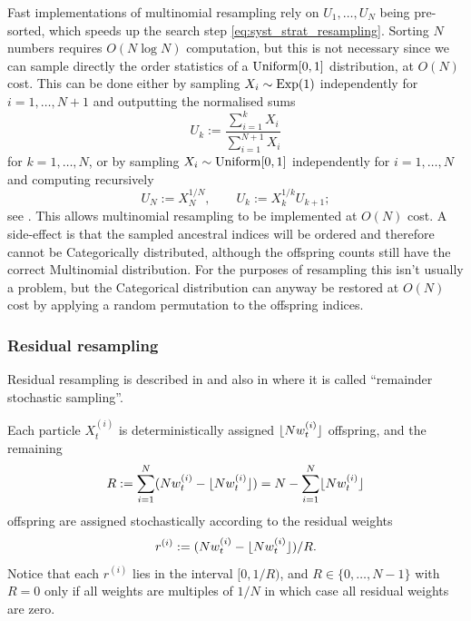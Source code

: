 Fast implementations of multinomial resampling rely on $U_1,\dots,U_N$ being pre-sorted, which speeds up the search step \eqref{eq:syst_strat_resampling}. Sorting $N$ numbers requires $O(N\log N)$ computation, but this is not necessary since we can sample directly the order statistics of a $\operatorname{Uniform}[0,1]$ distribution, at $O(N)$ cost.
This can be done either by 
sampling $X_i \sim \operatorname{Exp}(1)$ independently for $i=1,\dots,N+1$ and outputting the normalised sums
\begin{equation*}
U_k := \frac{\sum_{i=1}^k X_i}{\sum_{i=1}^{N+1} X_i}
\end{equation*}
for $k=1,\dots,N$,
or by sampling $X_i \sim \operatorname{Uniform}[0,1]$ independently for $i=1,\dots,N$ and computing recursively
\begin{equation*}
U_N := X_N^{1/N} , \qquad U_k := X_k^{1/k} U_{k+1} ;
\end{equation*}
see \textcite[Chapter 5, Section 3.1]{devroye1986}.
This allows multinomial resampling to be implemented at $O(N)$ cost. 
A side-effect is that the sampled ancestral indices will be ordered and therefore cannot be Categorically distributed, although the offspring counts still have the correct Multinomial distribution. For the purposes of resampling this isn't usually a problem, but the Categorical distribution can anyway be restored at $O(N)$ cost by applying a random permutation to the offspring indices.




\subsubsection{Residual resampling}
Residual resampling is described in \textcite{liu1998} and also in \textcite{whitley1994} where it is called ``remainder stochastic sampling''.

Each particle $X_{t}^{(i)}$ is deterministically assigned $\lfloor N w_t^{(i)} \rfloor$ offspring, and the remaining
\begin{equation*}
R := \sum_{i=1}^N ( Nw_t^{(i)} - \lfloor N w_t^{(i)} \rfloor) = N- \sum_{i=1}^N \lfloor N w_t^{(i)} \rfloor
\end{equation*}
offspring are assigned stochastically according to the residual weights
\begin{equation*}
r^{(i)} := ( Nw_t^{(i)} - \lfloor N w_t^{(i)} \rfloor) /R .
\end{equation*}
Notice that each $r^{(i)}$ lies in the interval $[0, 1/R)$, and $R\in\{0,\dots,N-1\}$ with $R=0$ only if all weights are multiples of $1/N$ in which case all residual weights are zero.

